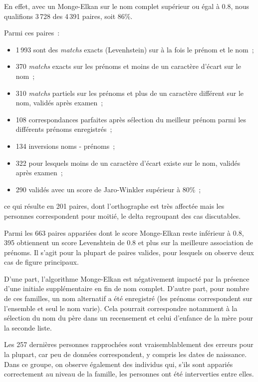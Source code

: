 \documentclass[a4paper,12pt,twoside]{book}
\begin{document}
	            En effet, avec un Monge-Elkan sur le nom complet supérieur ou égal à 0.8, nous qualifions 3\,728 des 4\,391 paires, soit 86\%.
	            
	            Parmi ces paires~:
	            \begin{itemize}
	                \item 1\,993 sont des \textit{matchs} exacts (Levenhstein) sur à la fois le prénom et le nom~;
	                \item 370 \textit{matchs} exacts sur les prénoms et moins de un caractère d'écart sur le nom~;
	                \item 310 \textit{matchs} partiels sur les prénoms et plus de un caractère différent sur le nom, validés après examen~;
	                \item 108 correspondances parfaites après sélection du meilleur prénom parmi les différents prénoms enregistrés~;
	                \item 134 inversions noms - prénoms~;
	                \item 322 pour lesquels moins de un caractère d'écart existe sur le nom, validés après examen~;
	                \item 290 validés avec un score de Jaro-Winkler supérieur à 80\%~;
	            \end{itemize}
	            ce qui résulte en 201 paires, dont l'orthographe est très affectée mais les personnes correspondent pour moitié, le delta regroupant des cas discutables.
	            \pagebreak
	            
	            Parmi les 663 paires appariées dont le score Monge-Elkan reste inférieur à 0.8, 395 obtiennent un score Levenshtein de 0.8 et plus sur la meilleure association de prénoms. Il s'agit pour la plupart de paires valides, pour lesquels on observe deux cas de figure principaux.
	            
	            D'une part, l'algorithme Monge-Elkan est négativement impacté par la présence d'une initiale supplémentaire en fin de nom complet. D'autre part, pour nombre de ces familles, un nom alternatif a été enregistré (les prénoms correspondent sur l'ensemble et seul le nom varie). Cela pourrait correspondre notamment à la sélection du nom du père dans un recensement et celui d'enfance de la mère pour la seconde liste.
	            
    	        Les 257 dernières personnes rapprochées sont vraisemblablement des erreurs pour la plupart, car peu de données correspondent, y compris les dates de naissance.
    	        Dans ce groupe, on observe également des individus qui, s'ils sont appariés correctement au niveau de la famille, les personnes ont été interverties entre elles.
    	        
\end{document}
